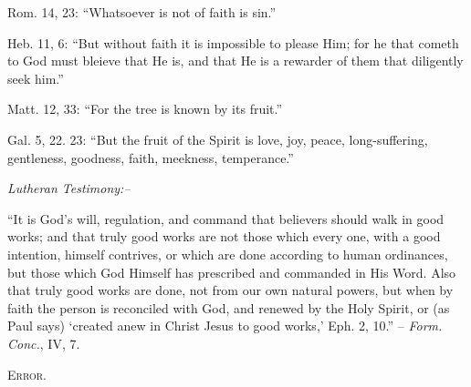 \documentclass[
]{book}
\begin{document}
Rom. 14, 23: ``Whatsoever is not of faith is sin.''

Heb. 11, 6: ``But without faith it is impossible to please Him; for he that cometh to God must bleieve that He is, and that He is a rewarder of them that diligently seek him.''

Matt. 12, 33: ``For the tree is known by its fruit.''

Gal. 5, 22. 23: ``But the fruit of the Spirit is love, joy, peace, long-suffering, gentleness, goodness, faith, meekness, temperance.''

\begin{center}
\textsl{Lutheran Testimony:--}
\end{center}

``It is God's will, regulation, and command that believers should walk in good works; and that truly good works are not those which every one, with a good intention, himself contrives, or which are done according to human ordinances, but those which God Himself has prescribed and commanded in His Word. Also that truly good works are done, not from our own natural powers, but when by faith the person is reconciled with God, and renewed by the Holy Spirit, or (as Paul says) `created anew in Christ Jesus to good works,' Eph. 2, 10.'' -- \emph{Form. Conc.}, IV, 7.

\begin{center}
\textsc{Error.}
\end{center}
\end{document}

